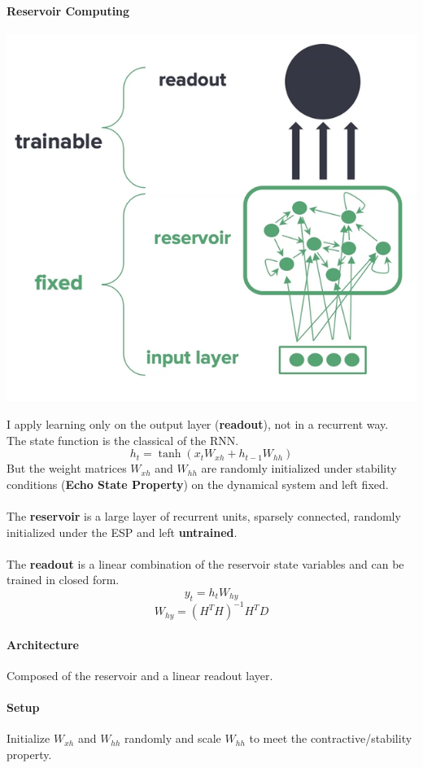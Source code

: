 \documentclass[10pt]{report}
\begin{document}
\paragraph{Reservoir Computing}
\begin{center}
	\includegraphics[scale=0.5]{103.png}
\end{center}
I apply learning only on the output layer (\textbf{readout}), not in a recurrent way.\\
The state function is the classical of the RNN.
$$h_t = \tanh(x_tW_{xh}+h_{t-1}W_{hh})$$
But the weight matrices $W_{xh}$ and $W_{hh}$ are randomly initialized under stability conditions (\textbf{Echo State Property}) on the dynamical system and left fixed.\\\\
The \textbf{reservoir} is a large layer of recurrent units, sparsely connected, randomly initialized under the ESP and left \textbf{untrained}.\\\\
The \textbf{readout} is a linear combination of the reservoir state variables and can be trained in closed form.
$$y_t = h_tW_{hy}$$
$$W_{hy} = (H^TH)^{-1}H^TD$$
\paragraph{Architecture} Composed of the reservoir and a linear readout layer.
\paragraph{Setup} Initialize $W_{xh}$ and $W_{hh}$ randomly and scale $W_{hh}$ to meet the contractive/stability property.
\end{document}
